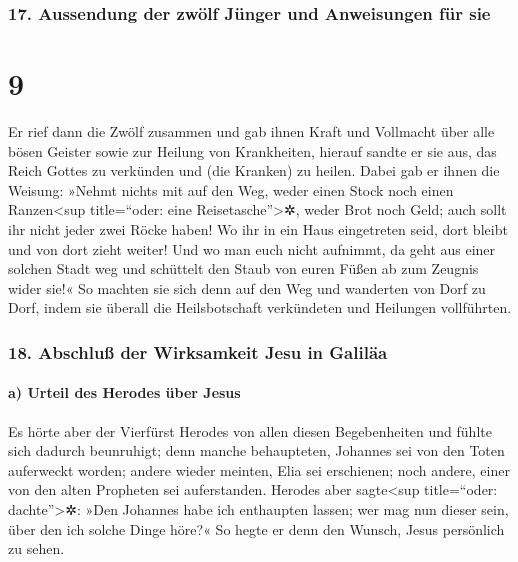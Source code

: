 \hypertarget{aussendung-der-zwuxf6lf-juxfcnger-und-anweisungen-fuxfcr-sie}{%
\subsubsection{17. Aussendung der zwölf Jünger und Anweisungen für
sie}\label{aussendung-der-zwuxf6lf-juxfcnger-und-anweisungen-fuxfcr-sie}}

\hypertarget{section-8}{%
\section{9}\label{section-8}}

 Er rief dann die Zwölf zusammen und gab ihnen Kraft und
Vollmacht über alle bösen Geister sowie zur Heilung von Krankheiten,
 hierauf sandte er sie aus, das Reich Gottes zu verkünden
und (die Kranken) zu heilen.  Dabei gab er ihnen die
Weisung: »Nehmt nichts mit auf den Weg, weder einen Stock noch einen
Ranzen\textless sup title=``oder: eine Reisetasche''\textgreater✲, weder
Brot noch Geld; auch sollt ihr nicht jeder zwei Röcke haben!
 Wo ihr in ein Haus eingetreten seid, dort bleibt und von
dort zieht weiter!  Und wo man euch nicht aufnimmt, da
geht aus einer solchen Stadt weg und schüttelt den Staub von euren Füßen
ab zum Zeugnis wider sie!«  So machten sie sich denn auf
den Weg und wanderten von Dorf zu Dorf, indem sie überall die
Heilsbotschaft verkündeten und Heilungen vollführten.

\hypertarget{abschluuxdf-der-wirksamkeit-jesu-in-galiluxe4a}{%
\subsubsection{18. Abschluß der Wirksamkeit Jesu in
Galiläa}\label{abschluuxdf-der-wirksamkeit-jesu-in-galiluxe4a}}

\hypertarget{a-urteil-des-herodes-uxfcber-jesus}{%
\paragraph{a) Urteil des Herodes über
Jesus}\label{a-urteil-des-herodes-uxfcber-jesus}}

 Es hörte aber der Vierfürst Herodes von allen diesen
Begebenheiten und fühlte sich dadurch beunruhigt; denn manche
behaupteten, Johannes sei von den Toten auferweckt worden;
 andere wieder meinten, Elia sei erschienen; noch andere,
einer von den alten Propheten sei auferstanden.  Herodes
aber sagte\textless sup title=``oder: dachte''\textgreater✲: »Den
Johannes habe ich enthaupten lassen; wer mag nun dieser sein, über den
ich solche Dinge höre?« So hegte er denn den Wunsch, Jesus persönlich zu
sehen.

